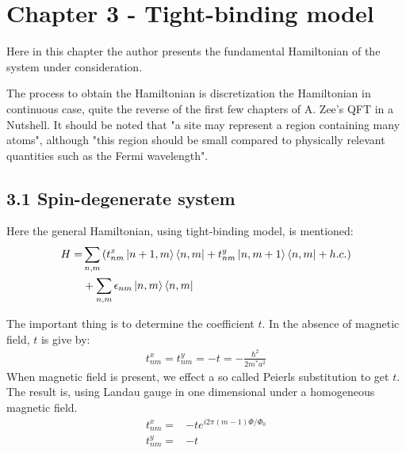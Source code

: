 \documentclass{article}
\numberwithin{equation}{subsection} %
\theoremstyle{definition}
\begin{document}
\section{Chapter 3 - Tight-binding model}
\label{sec:Chapter_3_Tight-binding_model}

Here in this chapter the author presents the fundamental Hamiltonian of
the system under consideration.

The process to obtain the Hamiltonian is discretization the Hamiltonian
in continuous case, quite the reverse of the first few chapters of
A. Zee's QFT in a Nutshell. It should be noted that "a site may represent 
a region containing many atoms", although "this region should be small 
compared to physically relevant quantities such as the Fermi wavelength".

  \subsection{3.1 Spin-degenerate system}
  \label{sec:3.1_Spin-degenerate_system}
  Here the general Hamiltonian, using tight-binding model, is
  mentioned:
  \begin{align}
      H = &\sum_{n,m} 
          \left( t^x_{nm}\ket{n+1,m}\bra{n,m}
              +t^y_{nm}\ket{n,m+1}\bra{n,m}+h.c.\right)\nonumber\\
          &+\sum_{n,m} \epsilon_{nm}\ket{n,m}\bra{n,m}
  \end{align}

  The important thing is to determine the coefficient $t$.
  In the absence of magnetic field, $t$ is give by:
  \begin{align}
      t^x_{nm}=t^y_{nm}=-t=-\frac{\hbar^2}{2m^* a^2}
  \end{align}
  When magnetic field is present, we effect a so called Peierls
  substitution to get $t$.
  The result is, using Landau gauge in one dimensional under a
  homogeneous magnetic field.
  \begin{align}
      t^x_{nm} =& -t e^{i2\pi (m-1) \Phi/\Phi_0} \\
      t^y_{nm} =& -t
  \end{align}
\end{document}
